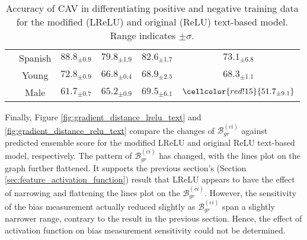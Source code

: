 \begin{table}[H]
\begin{tabular}{|c|c|cc|cc|}
                          & Spanish                                           & \multicolumn{1}{c|}{$88.8_{\pm 0.9}$}                     & $79.8_{\pm 1.9}$                     & \multicolumn{1}{c|}{$82.6_{\pm 1.7}$}                     & $73.1_{\pm 6.8}$                     \\ \cline{2-6}
                          & Young                                             & \multicolumn{1}{c|}{$72.8_{\pm 0.9}$}                     & $66.8_{\pm 0.4}$                     & \multicolumn{1}{c|}{$68.9_{\pm 2.5}$}                     & $68.3_{\pm 1.1}$                     \\ \cline{2-6}
                          & Male                                              & \multicolumn{1}{c|}{$61.7_{\pm 0.7}$}                     & $65.2_{\pm 0.9}$                     & \multicolumn{1}{c|}{$69.5_{\pm 6.1}$}                     & $\cellcolor{red!15}{51.7_{\pm 9.1}}$ \\ \hline
    \end{tabular}
    \caption{Accuracy of CAV in differentiating positive and negative training data for the modified (LReLU) and original (ReLU) text-based model. Range indicates $\pm \sigma$.}
    \label{tab:CAV_accuracy_lrelu}
\end{table}


Finally, Figure \ref{fig:gradient_distance_lrelu_text} and \ref{fig:gradient_distance_relu_text} compare the changes of $\mathcal{B}^{(ci)}_{gr}$ against predicted ensemble score for the modified LReLU and original ReLU text-based model, respectively. The pattern of $\mathcal{B}^{(ci)}_{gr}$ has changed, with the lines plot on the graph further flattened. It supports the previous section's (Section \ref{sec:feature_activation_function}) result that LReLU appears to have the effect of narrowing and flattening the lines plot on the $\mathcal{B}^{(ci)}_{gr}$. However, the sensitivity of the bias measurement actually reduced slightly as $\mathcal{B}^{(ci)}_{gr}$ span a slightly narrower range, contrary to the result in the previous section. Hence, the effect of activation function on bias measurement sensitivity could not be determined.

